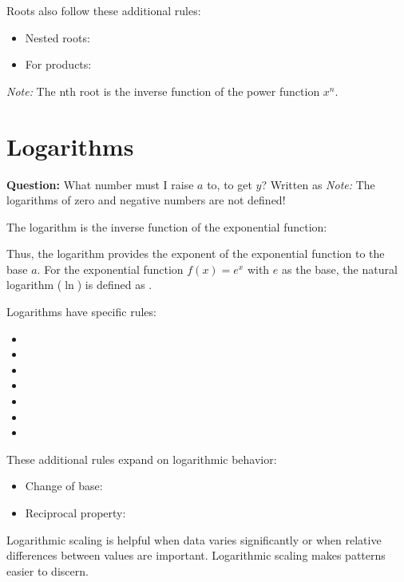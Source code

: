 Roots also follow these additional rules: \begin{itemize} \item Nested roots:  \item For products:  \end{itemize}

\textit{Note:} The nth root is the inverse function of the power function $x^n$.

\section{Logarithms}\label{Logarithms}

\textbf{Question:} What number must I raise \( a \) to, to get \( y \)? Written as 
\textit{Note:} The logarithms of zero and negative numbers are not defined!

The logarithm is the inverse function of the exponential function:


Thus, the logarithm provides the exponent of the exponential function to the base \( a \). For the exponential function \( f(x) = e^x \) with \( e \) as the base, the natural logarithm (\(\ln\)) is defined as 
.

Logarithms have specific rules:
\begin{itemize}
    \item {}
    \item {}
    \item {}
    \item {}
    \item {}
    \item {}
    \item {}
\end{itemize}

These additional rules expand on logarithmic behavior: \begin{itemize} \item Change of base:  \item Reciprocal property:  \end{itemize}

Logarithmic scaling is helpful when data varies significantly or when relative differences between values are important. Logarithmic scaling makes patterns easier to discern.
